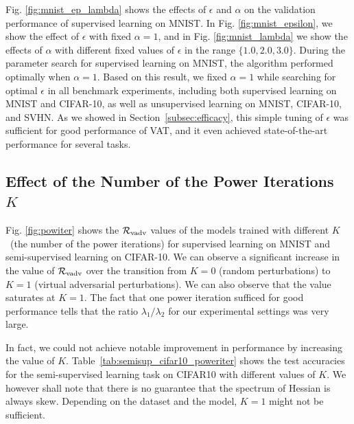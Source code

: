 \documentclass[10pt,journal,compsoc]{IEEEtran}
\newcommand\mnote[1]{\textcolor{blue}{(MIYATO: #1)}}
\newcommand\iwrite[1]{\textcolor{red}{Meada: #1}}
\newcommand\new[1]{\textcolor{blue}{#1}}
\begin{document}
Fig. \ref{fig:mnist_ep_lambda} shows the effects of $\epsilon$ and $\alpha$ on the validation performance of supervised learning on MNIST.
In Fig. \ref{fig:mnist_epsilon}, we show the effect of $\epsilon$ with fixed $\alpha=1$, and in Fig. \ref{fig:mnist_lambda} we show the effects of $\alpha$ with different fixed values of $\epsilon$ in the range $\{1.0, 2.0, 3.0\}$.
During the parameter search for supervised learning on MNIST, the algorithm performed optimally when $\alpha =1$.
Based on this result, we fixed $\alpha =1$ while searching for optimal $\epsilon$ in all benchmark experiments, including both supervised learning on MNIST and CIFAR-10, as well as  unsupervised learning on  MNIST, CIFAR-10, and SVHN.
As we showed in Section~\ref{subsec:efficacy}, this simple tuning of $\epsilon$  was sufficient for good performance of VAT, and it even achieved state-of-the-art performance for several tasks. 

\subsection{\label{subsec:piter} Effect of the Number of the Power Iterations $K$}

Fig. \ref{fig:powiter} shows the $\mathcal{R}_{\rm vadv}$ values of the models trained with different $K$~(the number of the power iterations) for supervised learning on MNIST and semi-supervised learning on CIFAR-10. We can observe a significant increase in the value of $\mathcal{R}_{\rm vadv}$ over the transition from $K=0$ (random perturbations) to $K=1$ (virtual adversarial perturbations). We 
can also observe that the value saturates at $K =1$. 
The fact that one power iteration sufficed for good performance tells that the ratio $\lambda_1/\lambda_2$ for our experimental settings was very large.

In fact, we could not achieve notable improvement in performance by increasing the value of $K$. 
Table~\ref{tab:semisup_cifar10_poweriter} shows the test accuracies for the semi-supervised learning task on CIFAR10 with different values of $K$.
We however shall note that there is no guarantee that the spectrum of Hessian is always skew. Depending on the dataset and the model,  $K=1$ might not be sufficient. %
\end{document}
